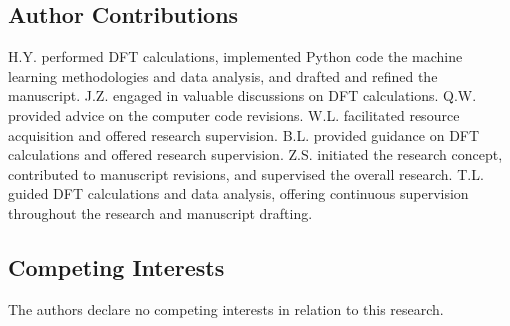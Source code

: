 \subsection{Author Contributions}
H.Y. performed DFT calculations, implemented Python code the machine learning methodologies and data analysis, and drafted and refined the manuscript.
J.Z. engaged in valuable discussions on DFT calculations.
Q.W. provided advice on the computer code revisions.
W.L. facilitated resource acquisition and offered research supervision.
B.L. provided guidance on DFT calculations and offered research supervision.
Z.S. initiated the research concept, contributed to manuscript revisions, and supervised the overall research.
T.L. guided DFT calculations and data analysis, offering continuous supervision throughout the research and manuscript drafting.


\subsection{Competing Interests}
The authors declare no competing interests in relation to this research.
